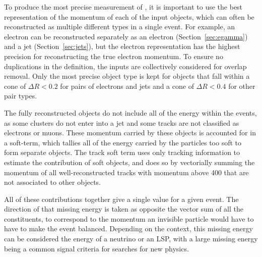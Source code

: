 To produce the most precise measurement of \met, it is important to use the best representation of the momentum of each of the input objects, which can often be reconstructed as multiple different types in a single event.
For example, an electron can be reconstructed separately as an electron (Section~\ref{sec:egamma}) and a jet (Section~\ref{sec:jets}), but the electron representation has the highest precision for reconstructing the true electron momentum.
To ensure no duplications in the \met definition, the inputs are collectively considered for overlap removal.
Only the most precise object type is kept for objects that fall within a cone of $\Delta R < 0.2$ for pairs of electrons and jets and a cone of $\Delta R < 0.4$ for other pair types.

The fully reconstructed objects do not include all of the energy within the events, as some clusters do not enter into a jet and some tracks are not classified as electrons or muons.
These momentum carried by these objects is accounted for in a soft-term, which tallies all of the energy carried by the particles too soft to form separate objects.
The track soft term uses only tracking information to estimate the contribution of soft objects, and does so by vectorially summing the momentum of all well-reconstructed tracks with momentum above 400 \MeV that are not associated to other objects.

All of these contributions together give a single \met value for a given event.
The direction of that missing energy is taken as opposite the vector sum of all the constituents, to correspond to the momentum an invisible particle would have to have to make the event balanced.
Depending on the context, this missing energy can be considered the energy of a neutrino or an \ac{LSP}, with a large missing energy being a common signal criteria for searches for new physics.

